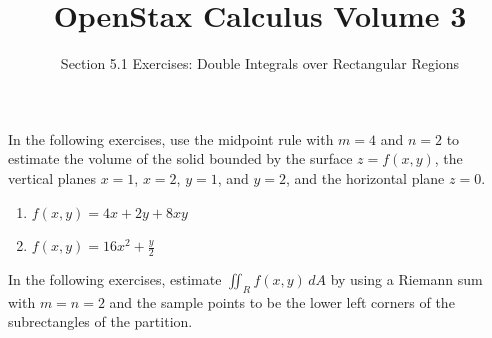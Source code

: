 \documentclass{exercises}
\title{OpenStax Calculus Volume 3}
\subtitle{Section 5.1 Exercises: Double Integrals over Rectangular Regions}
\author{}
\date{}
\begin{document}
\maketitle


In the following exercises, use the midpoint rule with $m=4$ and $n=2$ to estimate the volume of the solid bounded by the surface $z=f(x,y)$, the vertical planes $x=1$, $x=2$, $y=1$, and $y=2$, and the horizontal plane $z=0$.

\begin{enumerate}[start=1]
\item $f(x,y)=4x+2y+8xy$
\item $f(x,y)=16x^{2}+\frac{y}{2}$
\end{enumerate}

In the following exercises, estimate $\iint_{R}f\left( x,y \right)\,dA$ by using a Riemann sum with $m=n=2$ and the sample points to be the lower left corners of the subrectangles of the partition.
\end{document}
